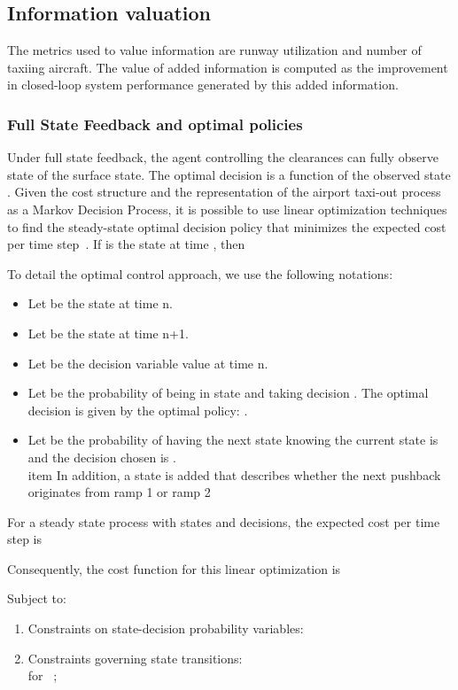 \documentclass[letterpaper]{article}
\begin{document}
\subsection{Information valuation}
The metrics used to value information are runway utilization and number of taxiing aircraft. 
The value of added information is computed as the improvement in closed-loop system performance generated by this added information.


\subsubsection{Full State Feedback and optimal policies}\label{s:LP}

Under full state feedback, the agent controlling the clearances can fully observe state of the surface state.
The optimal decision  is a function of the observed state . Given the cost structure and the representation of the airport taxi-out process as a Markov Decision Process, it is possible to use linear optimization techniques to find the steady-state optimal decision policy  that minimizes
the expected cost per time step~\cite{Hiller2001}. If  is the state at time , then
 
To detail the optimal control approach, we use the following notations:
\begin{itemize}
\item Let  be the state at time n.
\item Let   be the state at time n+1.
\item Let  be the decision variable value at time n.
\item Let  be the probability of being in state  and taking decision . The optimal decision  is given by the optimal policy: .
\item Let  be the probability of having the next state  knowing the current state is  and the decision chosen is .
\\item In addition, a state is added that describes whether the next pushback originates from ramp 1 or ramp 2 
\end{itemize}

For a steady state process with  states and  decisions, the expected cost per time step is \cite{Hiller2001}
   

Consequently, the cost function for this linear optimization is
 

Subject to:
\begin{enumerate}
\item Constraints on state-decision probability variables:




\item Constraints governing state transitions:
 \\
\mbox{for } ; 

\end{enumerate}
\end{document}
